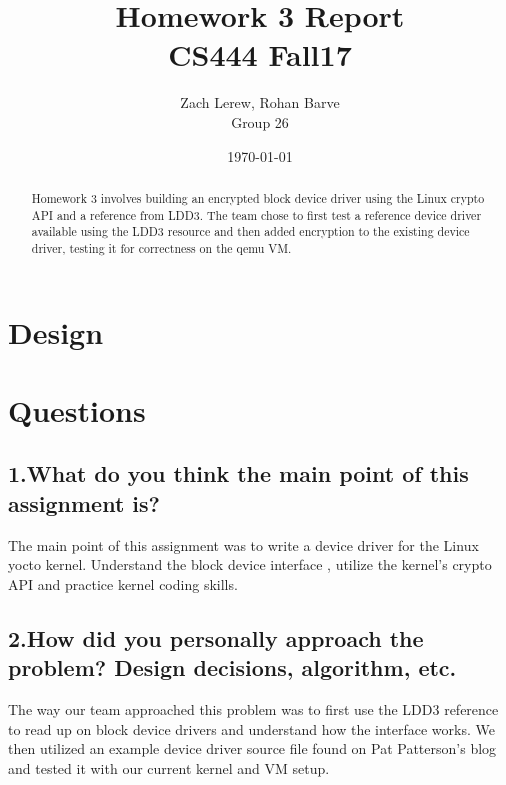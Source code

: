 \documentclass[letterpaper,10pt,fleqn]{article}
\title{Homework 3 Report\\\large CS444 Fall17}
\author{Zach Lerew, Rohan Barve\\\large Group 26}
\date{\today}
\begin{document}
	\begin{titlingpage}
		\maketitle
		\begin{abstract}
			\noindent Homework 3 involves building an encrypted block device driver using the Linux crypto  API and a reference from LDD3. The team chose to first test a reference device driver available using the LDD3 resource and then added encryption to the existing device driver, testing it for correctness on the qemu VM.

		\end{abstract}
	\end{titlingpage}


	\section*{Design}


	\section*{Questions}
	\subsection*{1.What do you think the main point of this assignment is?}
	The main point of this assignment was to write a device driver for the Linux yocto kernel.
	Understand the block device interface , utilize the kernel's crypto API and practice kernel
	coding skills.

	\subsection*{2.How did you personally approach the problem? Design decisions, algorithm, etc.}
	The way our team approached this problem was to first use the LDD3 reference to read up on block device drivers and understand how the interface works. We then utilized an example device driver source file found on Pat Patterson's blog and tested it with our current kernel and VM setup.
\end{document}
